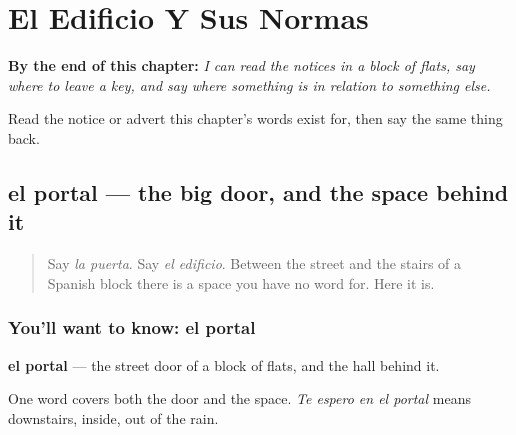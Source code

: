 
\chapter{El Edificio Y Sus Normas}
\label{ch:es-edificio}

\begin{chapteropening}
\textbf{By the end of this chapter:} \emph{I can read the notices in a block of flats, say where to leave a key, and say where something is in relation to something else.}

Read the notice or advert this chapter's words exist for, then say the same thing back.
\end{chapteropening}

\section[el portal]{el portal — the big door, and the space behind it}

\label{lesson:ES-C433-portal}



\begin{quote}
Say \emph{la puerta}. Say \emph{el edificio}. Between the street and the stairs of a Spanish block there is a space you have no word for. Here it is.
\end{quote}

\subsection*{You'll want to know: el portal}
\textbf{el portal} — the street door of a block of flats, and the hall behind it.

One word covers both the door and the space. \emph{Te espero en el portal} means downstairs, inside, out of the rain.

